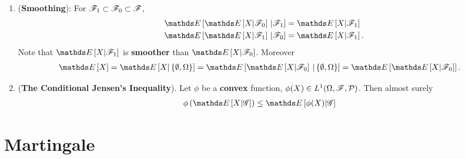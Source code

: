 \documentclass[11pt]{article}
\begin{document}
\begin{itemize}
\begin{proposition}
\begin{enumerate}
\item (\textbf{Smoothing}): For ${\mathscr F}_{1}\subset {\mathscr F}_{0} \subset {\mathscr F}$, 
\begin{align*}
\E{}{\E{}{X| \srF_{0}}\,|\srF_{1} } &= \E{}{X| \srF_{1}}\\
\E{}{\E{}{X| \srF_{1}}\,|\srF_{0} } &= \E{}{X| \srF_{1}}.
\end{align*} Note that $ \E{}{X| \srF_{1}}$ is \textbf{smoother} than $ \E{}{X| \srF_{0}}$.
Moreover
\begin{align*}
\E{}{X} = \E{}{X| \set{\emptyset, \Omega}} &= \E{}{\E{}{X| \srF_{0}}\,|\set{\emptyset, \Omega} } = \E{}{\E{}{X| \srF_{0}}}.
\end{align*}


\item (\textbf{The Conditional Jensen's Inequality}). Let $\phi$ be a \textbf{convex} function, $\phi(X) \in L^1(\Omega, {\mathscr F}, {\mathcal P})$. Then almost surely
\begin{align*}
\phi\paren{\E{}{X | \srG}} &\le \E{}{\phi(X) | \srG}
\end{align*}
\end{enumerate}
\end{proposition}
\end{itemize}

\section{Martingale}




\newpage


\end{document}
